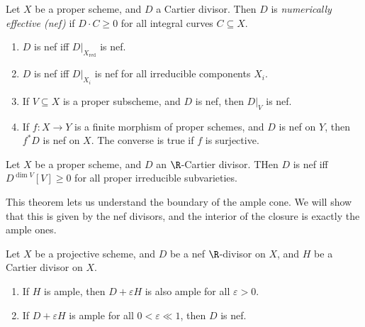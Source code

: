 \documentclass[a4paper]{article}
\DeclareMathOperator\red{red}
\begin{document}
\begin{defi}
  Let $X$ be a proper scheme, and $D$ a Cartier divisor. Then $D$ is \emph{numerically effective (nef)} if $D \cdot C \geq 0$ for all integral curves $C \subseteq X$.
\end{defi}

\begin{prop}\leavevmode
  \begin{enumerate}
    \item $D$ is nef iff $D|_{X_{\red}}$ is nef.
    \item $D$ is nef iff $D|_{X_i}$ is nef for all irreducible components $X_i$.
    \item If $V \subseteq X$ is a proper subscheme, and $D$ is nef, then $D|_V$ is nef.
    \item If $f: X \to Y$ is a finite morphism of proper schemes, and $D$ is nef on $Y$, then $f^* D$ is nef on $X$. The converse is true if $f$ is surjective.
  \end{enumerate}
\end{prop}


\begin{thm}
  Let $X$ be a proper scheme, and $D$ an $\R$-Cartier divisor. THen $D$ is nef iff $D^{\dim V}[V] \geq 0$ for all proper irreducible subvarieties.
\end{thm}
This theorem lets us understand the boundary of the ample cone. We will show that this is given by the nef divisors, and the interior of the closure is exactly the ample ones.
\begin{cor}
  Let $X$ be a projective scheme, and $D$ be a nef $\R$-divisor on $X$, and $H$ be a Cartier divisor on $X$.
  \begin{enumerate}
    \item If $H$ is ample, then $D + \varepsilon H$ is also ample for all $\varepsilon > 0$.
    \item If $D + \varepsilon H$ is ample for all $0 < \varepsilon \ll 1$, then $D$ is nef.
  \end{enumerate}
\end{cor}
\end{document}
